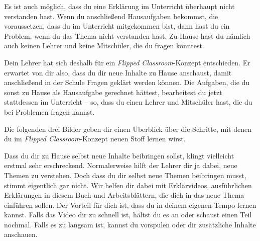 \documentclass[../main.tex]{subfiles}
\begin{document}
Es ist auch möglich, dass du eine Erklärung im Unterricht überhaupt nicht verstanden hast. Wenn du anschließend Hausaufgaben bekommst, die voraussetzen, dass du im Unterricht mitgekommen bist, dann hast du ein Problem, wenn du das Thema nicht verstanden hast. Zu Hause hast du nämlich auch keinen Lehrer und keine Mitschüler, die du fragen könntest.

Dein Lehrer hat sich deshalb für ein \emph{Flipped Classroom}-Konzept entschieden. Er erwartet von dir also, dass du dir neue Inhalte zu Hause anschaust, damit anschließend in der Schule Fragen geklärt werden können. Die Aufgaben, die du sonst zu Hause als Hausaufgabe gerechnet hättest, bearbeitest du jetzt stattdessen im Unterricht -- so, dass du einen Lehrer und Mitschüler hast, die du bei Problemen fragen kannst. 

Die folgenden drei Bilder geben dir einen Überblick über die Schritte, mit denen du im \emph{Flipped Classroom}-Konzept neuen Stoff lernen wirst.

\begin{multicols}{3}
\end{multicols}

Dass du dir zu Hause selbst neue Inhalte beibringen sollst, klingt vielleicht erstmal sehr erschreckend. Normalerweise hilft der Lehrer dir ja dabei, neue Themen zu verstehen. Doch dass du dir selbst neue Themen beibringen musst, stimmt eigentlich gar nicht. Wir helfen dir dabei mit Erklärvideos, ausführlichen Erklärungen in diesem Buch und Arbeitsblättern, die dich in das neue Thema einführen sollen. Der Vorteil für dich ist, dass du in deinem eigenen Tempo lernen kannst. Falls das Video dir zu schnell ist, hältst du es an oder schaust einen Teil nochmal. Falls es zu langsam ist, kannst du vorspulen oder dir zusätzliche Inhalte anschauen.
\end{document}
